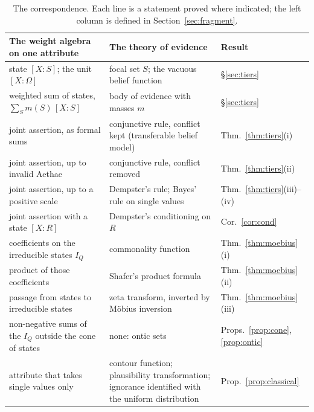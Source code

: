 \begin{table}[t]
\centering\small
\renewcommand{\arraystretch}{1.15}
\begin{tabular}{@{}p{}p{}l@{}}
\toprule
The weight algebra on one attribute & The theory of evidence & Result\\
\midrule
state $[X:S]$; the unit $[X:\Omega]$ & focal set $S$; the vacuous belief function & \S\ref{sec:tiers}\\
weighted sum of states, $\sum_S m(S)\,[X:S]$ & body of evidence with masses $m$ & \S\ref{sec:tiers}\\
joint assertion, as formal sums & conjunctive rule, conflict kept (transferable belief model) & Thm.~\ref{thm:tiers}(i)\\
joint assertion, up to invalid Aethae & conjunctive rule, conflict removed & Thm.~\ref{thm:tiers}(ii)\\
joint assertion, up to a positive scale & Dempster's rule; Bayes' rule on single values & Thm.~\ref{thm:tiers}(iii)--(iv)\\
joint assertion with a state $[X:R]$ & Dempster's conditioning on $R$ & Cor.~\ref{cor:cond}\\
coefficients on the irreducible states $I_Q$ & commonality function & Thm.~\ref{thm:moebius}(i)\\
product of those coefficients & Shafer's product formula & Thm.~\ref{thm:moebius}(ii)\\
passage from states to irreducible states & zeta transform, inverted by M\"obius inversion & Thm.~\ref{thm:moebius}(iii)\\
non-negative sums of the $I_Q$ outside the cone of states & none: ontic sets & Props.~\ref{prop:cone}, \ref{prop:ontic}\\
attribute that takes single values only & contour function; plausibility transformation; ignorance identified with the uniform distribution & Prop.~\ref{prop:classical}\\
\bottomrule
\end{tabular}
\caption{\small The correspondence. Each line is a statement proved where indicated; the left column is defined in Section~\ref{sec:fragment}.}
\label{tab:dictionary}
\end{table}

